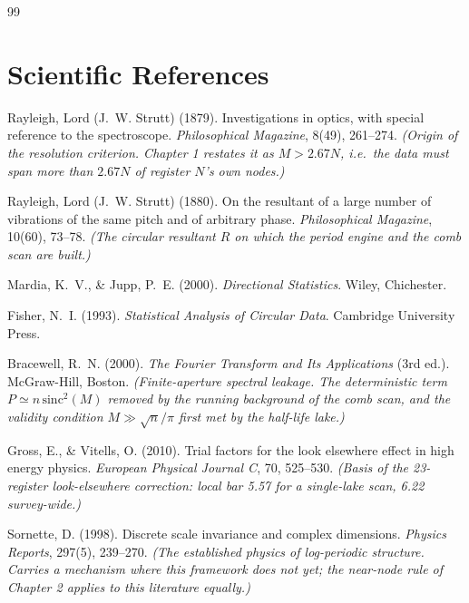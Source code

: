 \documentclass[11pt, letterpaper, openany]{book}
\begin{document}
\begin{thebibliography}{99}
\section*{Scientific References}


Rayleigh, Lord (J.~W. Strutt) (1879).
Investigations in optics, with special reference to the spectroscope.
\textit{Philosophical Magazine}, 8(49), 261--274.
\textit{(Origin of the resolution criterion. Chapter 1 restates it as $M > 2.67N$, i.e.\ the
data must span more than $2.67N$ of register $N$'s own nodes.)}

Rayleigh, Lord (J.~W. Strutt) (1880).
On the resultant of a large number of vibrations of the same pitch and of arbitrary phase.
\textit{Philosophical Magazine}, 10(60), 73--78.
\textit{(The circular resultant $R$ on which the period engine and the comb scan are built.)}

Mardia, K.~V., \& Jupp, P.~E. (2000).
\textit{Directional Statistics}. Wiley, Chichester.

Fisher, N.~I. (1993).
\textit{Statistical Analysis of Circular Data}. Cambridge University Press.

Bracewell, R.~N. (2000).
\textit{The Fourier Transform and Its Applications} (3rd ed.). McGraw-Hill, Boston.
\textit{(Finite-aperture spectral leakage. The deterministic term
$P \simeq n\,\mathrm{sinc}^2(M)$ removed by the running background of the comb scan, and the
validity condition $M \gg \sqrt{n}/\pi$ first met by the half-life lake.)}

Gross, E., \& Vitells, O. (2010).
Trial factors for the look elsewhere effect in high energy physics.
\textit{European Physical Journal C}, 70, 525--530.
\textit{(Basis of the 23-register look-elsewhere correction: local bar 5.57 for a single-lake
scan, 6.22 survey-wide.)}


Sornette, D. (1998).
Discrete scale invariance and complex dimensions.
\textit{Physics Reports}, 297(5), 239--270.
\textit{(The established physics of log-periodic structure. Carries a mechanism where this
framework does not yet; the near-node rule of Chapter 2 applies to this literature equally.)}


\end{thebibliography}
\end{document}
